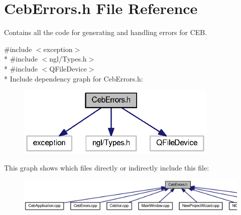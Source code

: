 \section{Ceb\-Errors.\-h File Reference}
\label{_ceb_errors_8h}


Contains all the code for generating and handling errors for C\-E\-B.  


{\ttfamily \#include $<$exception$>$}\\*
{\ttfamily \#include $<$ngl/\-Types.\-h$>$}\\*
{\ttfamily \#include $<$Q\-File\-Device$>$}\\*
Include dependency graph for Ceb\-Errors.\-h\-:\nopagebreak
\begin{figure}[H]
\begin{center}
\leavevmode
\includegraphics[width=272pt]{_ceb_errors_8h__incl}
\end{center}
\end{figure}
This graph shows which files directly or indirectly include this file\-:\nopagebreak
\begin{figure}[H]
\begin{center}
\leavevmode
\includegraphics[width=350pt]{_ceb_errors_8h__dep__incl}
\end{center}
\end{figure}
